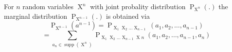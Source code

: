 For $n$ random variables $\operatorname{X}^{n}$ with joint probality distribution $\operatorname{P}_{\operatorname{X}^{n}}(.)$ the marginal distribution $\operatorname{P}_{\operatorname{X}^{n - 1}}(.)$ is obtained via 
$$\operatorname{P}_{\operatorname{X}^{n-1}}(a^{n-1}) = \operatorname{P}_{\operatorname{X}_{1} \operatorname{X}_{2} \dots \operatorname{X}_{n-1}}(a_{1}, a_{2}, \dots, a_{n-1})$$
$$= \sum\limits_{a_{n} \in \operatorname{supp}(\operatorname{X}^n)} \operatorname{P}_{\operatorname{X}_{1}\operatorname{X}_{2} \dots \operatorname{X}_{n-1}\operatorname{X}n}(a_{1}, a_{2}, \dots, a_{n-1}, a_{n})$$ 



